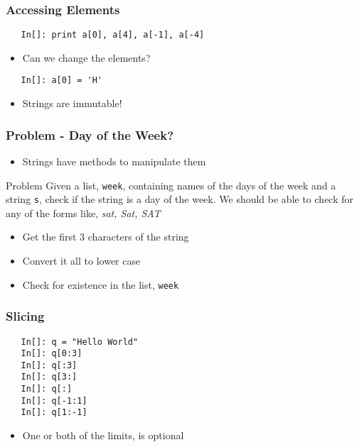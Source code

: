 \begin{frame}[fragile]
  \frametitle{Accessing Elements}
  \begin{lstlisting}
   In[]: print a[0], a[4], a[-1], a[-4]
  \end{lstlisting}
  \begin{itemize}
  \item Can we change the elements?
  \end{itemize}
  \begin{lstlisting}
   In[]: a[0] = 'H'
  \end{lstlisting}
  \begin{itemize}
  \item Strings are immutable!
  \end{itemize}
\end{frame}

\begin{frame}[fragile]
  \frametitle{Problem - Day of the Week?}
  \begin{itemize}
  \item Strings have methods to manipulate them
  \end{itemize}
  \begin{block}{Problem}
    Given a list, \texttt{week}, containing names of the days of the
    week and a string \texttt{s}, check if the string is a day of the
    week. We should be able to check for any of the forms like,
    \emph{sat, Sat, SAT}
  \end{block}
  \begin{itemize}
  \item Get the first 3 characters of the string
  \item Convert it all to lower case
  \item Check for existence in the list, \texttt{week}
  \end{itemize}
\end{frame}

\begin{frame}[fragile]
  \frametitle{Slicing}
  \begin{lstlisting}
   In[]: q = "Hello World"
   In[]: q[0:3]
   In[]: q[:3]
   In[]: q[3:]
   In[]: q[:]
   In[]: q[-1:1]
   In[]: q[1:-1]
  \end{lstlisting}
  \begin{itemize}
  \item One or both of the limits, is optional
  \end{itemize}
\end{frame}

